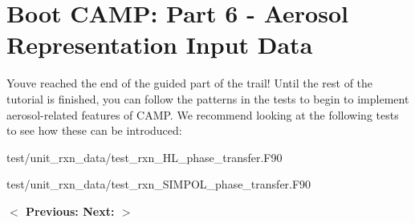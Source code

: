 \chapter{Boot CAMP\+: Part 6 -\/ Aerosol Representation Input Data}
\hypertarget{camp_tutorial_part_6}{}\label{camp_tutorial_part_6}
You\textquotesingle{}ve reached the end of the guided part of the trail! Until the rest of the tutorial is finished, you can follow the patterns in the tests to begin to implement aerosol-\/related features of CAMP. We recommend looking at the following tests to see how these can be introduced\+:


\begin{DoxyItemize}
\item {\ttfamily test/unit\+\_\+rxn\+\_\+data/test\+\_\+rxn\+\_\+\+HL\+\_\+phase\+\_\+transfer.\+F90}
\item {\ttfamily test/unit\+\_\+rxn\+\_\+data/test\+\_\+rxn\+\_\+\+SIMPOL\+\_\+phase\+\_\+transfer.\+F90}
\end{DoxyItemize}

 {\bfseries{ \texorpdfstring{$<$}{<} Previous\+: }}     {\bfseries{ Next\+: }}  {\bfseries{ \texorpdfstring{$>$}{>} }} 